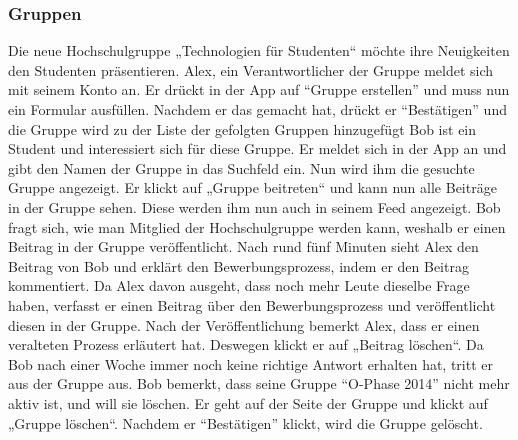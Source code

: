 \documentclass[parskip=full]{scrartcl}
\begin{document}
		\subsubsection{Gruppen}
		Die neue Hochschulgruppe „Technologien für Studenten“ möchte ihre Neuigkeiten den Studenten präsentieren. Alex, ein Verantwortlicher der Gruppe meldet sich mit seinem Konto an. Er drückt in der App auf “Gruppe erstellen” und muss nun ein Formular ausfüllen. Nachdem er das gemacht hat, drückt er “Bestätigen” und die Gruppe wird zu der Liste der gefolgten Gruppen hinzugefügt %
		Bob ist ein Student und interessiert sich für diese Gruppe. Er meldet sich in der App an und gibt den Namen der Gruppe in das Suchfeld ein. Nun wird ihm die gesuchte Gruppe angezeigt. Er klickt auf „Gruppe beitreten“ und kann nun alle Beiträge in der Gruppe sehen. Diese werden ihm nun auch in seinem \gls{Feed} angezeigt. Bob fragt sich, wie man Mitglied der Hochschulgruppe werden kann, weshalb er einen Beitrag in der Gruppe veröffentlicht. Nach rund fünf Minuten sieht Alex den Beitrag von Bob und erklärt den Bewerbungsprozess, indem er den Beitrag kommentiert. Da Alex davon ausgeht, dass noch mehr Leute dieselbe Frage haben, verfasst er einen Beitrag über den Bewerbungsprozess und veröffentlicht diesen in der Gruppe. Nach der Veröffentlichung bemerkt Alex, dass er einen veralteten Prozess erläutert hat. Deswegen klickt er auf „Beitrag löschen“.
		Da Bob nach einer Woche immer noch keine richtige Antwort erhalten hat, tritt er aus der Gruppe aus.
		Bob bemerkt, dass seine Gruppe “O-Phase 2014” nicht mehr aktiv ist, und will sie löschen. Er geht auf der Seite der Gruppe und klickt auf „Gruppe löschen“. Nachdem er “Bestätigen” klickt, wird die Gruppe gelöscht.
		
\end{document}
